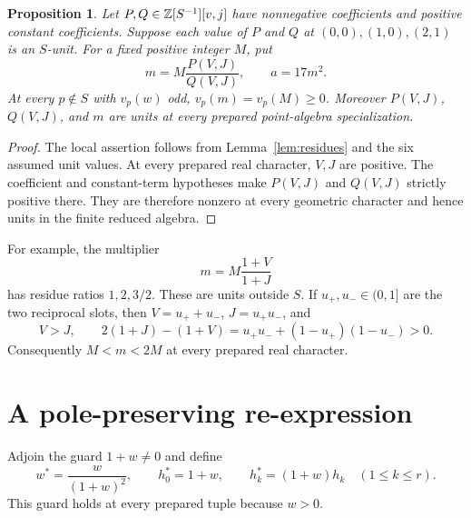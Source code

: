 \documentclass[11pt,a4paper]{article}
\newtheorem{proposition}[theorem]{Proposition}
\theoremstyle{definition}\newtheorem{definition}[theorem]{Definition}
\begin{document}
\begin{proposition}\label{prop:tracelevels}
Let $P,Q\in\mathbb Z[S^{-1}][v,j]$ have nonnegative coefficients and
positive constant coefficients. Suppose each value of $P$ and $Q$
at $(0,0),(1,0),(2,1)$ is an $S$-unit. For a fixed positive integer
$M$, put
\[
                     m=M\frac{P(V,J)}{Q(V,J)},\qquad a=17m^2.
\]
At every $p\notin S$ with $v_p(w)$ odd,
$v_p(m)=v_p(M)\ge0$. Moreover $P(V,J)$, $Q(V,J)$, and $m$
are units at every prepared point-algebra specialization.
\end{proposition}
\begin{proof}
The local assertion follows from Lemma~\ref{lem:residues} and the
six assumed unit values. At every prepared real character, $V,J$
are positive. The coefficient and constant-term hypotheses make
$P(V,J)$ and $Q(V,J)$ strictly positive there. They are therefore
nonzero at every geometric character and hence units in the finite
reduced algebra.
\end{proof}

For example, the multiplier
\begin{equation}\label{eq:boundedexample}
                         m=M\frac{1+V}{1+J}
\end{equation}
has residue ratios $1,2,3/2$. These are units outside $S$.
If $u_+,u_-\in(0,1]$ are the two reciprocal slots, then
$V=u_++u_-$, $J=u_+u_-$, and
\[
 V>J,\qquad 2(1+J)-(1+V)
       =u_+u_-+(1-u_+)(1-u_-)>0.
\]
Consequently $M<m<2M$ at every prepared real character.

\section{A pole-preserving re-expression}

Adjoin the guard $1+w\ne0$ and define
\begin{equation}\label{eq:normalization}
 w^*=\frac{w}{(1+w)^2},\qquad
 h_0^*=1+w,\qquad h_k^*=(1+w)h_k\quad(1\le k\le r).
\end{equation}
This guard holds at every prepared tuple because $w>0$.
\end{document}

